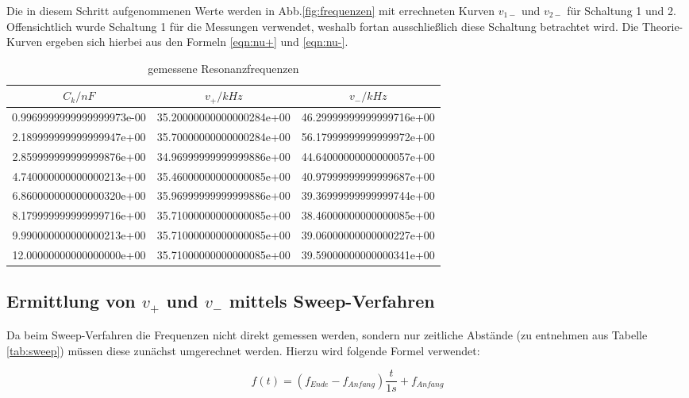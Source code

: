 Die in diesem Schritt aufgenommenen Werte werden in Abb.\ref{fig:frequenzen} mit errechneten Kurven $v_{1-}$ und $v_{2-}$ für Schaltung 1 und 2. Offensichtlich wurde Schaltung 1 für die Messungen verwendet, weshalb fortan ausschließlich diese Schaltung betrachtet wird. Die Theorie-Kurven ergeben sich hierbei aus den Formeln \eqref{eqn:nu+} und \eqref{eqn:nu-}.

\begin{table}
  \centering
\caption{gemessene Resonanzfrequenzen}
\label{tab:verhaeltnisse}
\begin{tabular}{S S S}
  \toprule
  {$C_k/nF$} & {$v_+/kHz$} & {$v_-/kHz$}\\
  \midrule
  0.9969999999999999973e-00 & 35.20000000000000284e+00 & 46.29999999999999716e+00\\
  2.189999999999999947e+00 & 35.70000000000000284e+00 & 56.17999999999999972e+00\\
  2.859999999999999876e+00 & 34.96999999999999886e+00 & 44.64000000000000057e+00\\
  4.740000000000000213e+00 & 35.46000000000000085e+00 & 40.97999999999999687e+00\\
  6.860000000000000320e+00 & 35.96999999999999886e+00 & 39.36999999999999744e+00\\
  8.179999999999999716e+00 & 35.71000000000000085e+00 & 38.46000000000000085e+00\\
  9.990000000000000213e+00 & 35.71000000000000085e+00 & 39.06000000000000227e+00\\
  12.00000000000000000e+00 & 35.71000000000000085e+00 & 39.59000000000000341e+00\\
\bottomrule
\end{tabular}
\end{table}
\FloatBarrier


\subsection{Ermittlung von $v_+$ und $v_-$ mittels Sweep-Verfahren}
\label{sec:sweep}

Da beim Sweep-Verfahren die Frequenzen nicht direkt gemessen werden, sondern nur zeitliche Abstände (zu entnehmen aus Tabelle \ref{tab:sweep}) müssen diese zunächst umgerechnet werden. Hierzu wird folgende Formel verwendet:

\begin{equation}
  f(t) = ( f_{Ende} - f_{Anfang} ) \frac{t}{1s} + f_{Anfang}
\end{equation}

